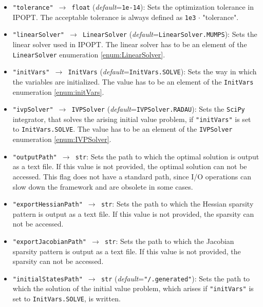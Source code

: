 \documentclass[12pt]{article}
\begin{document}
\begin{mdframed}[backgroundcolor=gray!10, roundcorner=10pt,
	linewidth=1pt]
	
\begin{itemize}
	
	\label{flag:tolerance}
	\item \texttt{"tolerance" $\rightarrow$ float} (\emph{default}=\texttt{1e-14}): Sets the optimization tolerance in IPOPT. The acceptable tolerance is always defined as \texttt{1e3} $\cdot$ "tolerance".
	
	\label{flag:linearSolver}
	\item \texttt{"linearSolver" $\rightarrow$ LinearSolver} (\emph{default}=\texttt{LinearSolver.MUMPS}): Sets the linear solver used in IPOPT. The linear solver has to be an element of the \texttt{LinearSolver} enumeration \ref{enum:LinearSolver}.
	
	\label{flag:initVars}
	\item \texttt{"initVars" $\rightarrow$ InitVars} (\emph{default}=\texttt{InitVars.SOLVE}): Sets the way in which the variables are initialized. The value has to be an element of the \texttt{InitVars} enumeration \ref{enum:initVars}.
	
	\label{flag:ivpSolver}
	\item \texttt{"ivpSolver" $\rightarrow$ IVPSolver} (\emph{default}=\texttt{IVPSolver.RADAU}): Sets the \texttt{SciPy} integrator, that solves the arising initial value problem, if \texttt{"initVars"} is set to \texttt{InitVars.SOLVE}. The value has to be an element of the \texttt{IVPSolver} enumeration \ref{enum:IVPSolver}.
	
	\label{flag:outputPath}
	\item \texttt{"outputPath" $\rightarrow$ str}: Sets the path to which the optimal solution is output as a text file. If this value is not provided, the optimal solution can not be accessed. This flag does not have a standard path, since I/O operations can slow down the framework and are obsolete in some cases.
	
	\label{flag:exportHessianPath}
	\item \texttt{"exportHessianPath" $\rightarrow$ str}: Sets the path to which the Hessian sparsity pattern is output as a text file. If this value is not provided, the sparsity can not be accessed.
	
	\label{flag:exportJacobianPath}
	\item \texttt{"exportJacobianPath" $\rightarrow$ str}: Sets the path to which the Jacobian sparsity pattern is output as a text file. If this value is not provided, the sparsity can not be accessed.
	
	\label{flag:initialStatesPath}
	\item \texttt{"initialStatesPath" $\rightarrow$ str} (\emph{default}=\texttt{"/.generated"}): Sets the path to which the solution of the initial value problem, which arises if \texttt{"initVars"} is set to \texttt{InitVars.SOLVE}, is written.
	
	
\end{itemize}
\end{mdframed}
\end{document}
